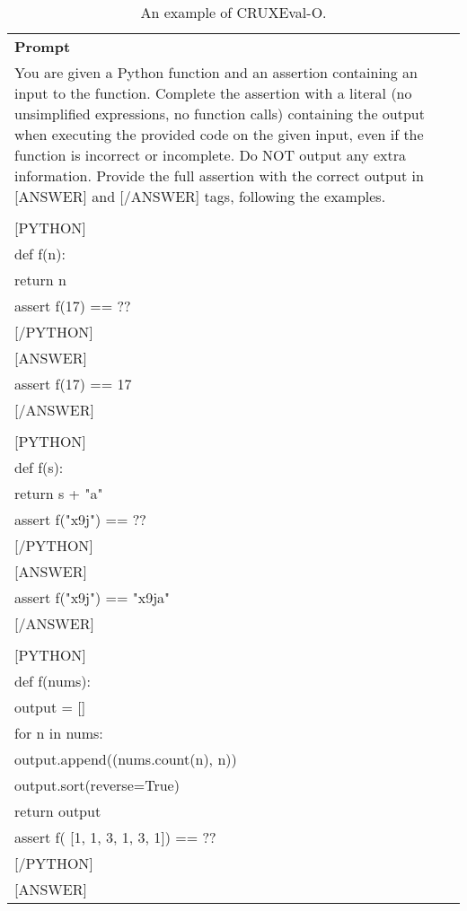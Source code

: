 \begin{table}[ht]
    \centering \small
\begin{tabular}{p{12cm}}
\toprule
\textbf{Prompt}\\
You are given a Python function and an assertion containing an input to the function. Complete the assertion with a literal (no unsimplified expressions, no function calls) containing the output when executing the provided code on the given input, even if the function is incorrect or incomplete. Do NOT output any extra information. Provide the full assertion with the correct output in 
[ANSWER] and 
[/ANSWER] tags, following the examples.\\
\\

[PYTHON]\\
def f(n):\\
    return n\\
assert f(17) == ??\\

[/PYTHON]\\

[ANSWER]\\
assert f(17) == 17\\

[/ANSWER]\\
\\

[PYTHON]\\
def f(s):\\
    return s + "a"\\
assert f("x9j") == ??\\

[/PYTHON]\\

[ANSWER]\\
assert f("x9j") == "x9ja"\\

[/ANSWER]\\
\\

[PYTHON]\\
def f(nums):\\
    output = 
[]\\
    for n in nums:\\
        output.append((nums.count(n), n))\\
    output.sort(reverse=True)\\
    return output\\
assert f(
[1, 1, 3, 1, 3, 1]) == ??\\

[/PYTHON]\\

[ANSWER]\\
\bottomrule
\end{tabular}
    \caption{\centering An example of CRUXEval-O.}
    \label{tab:CRUXEval_O_eval_format_example}
\end{table}